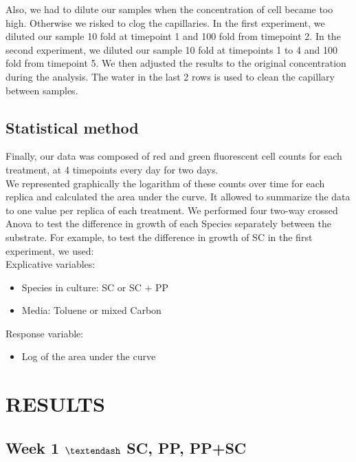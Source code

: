 \documentclass[a4paper, 10pt, conference]{ieeeconf}   %
\begin{document}
Also, we had to dilute our samples when the concentration of cell became too high. Otherwise we risked to clog the capillaries.
In the first experiment, we diluted our sample 10 fold at timepoint 1 and 100 fold from timepoint 2. In the second experiment, we diluted our sample 10 fold at timepoints 1 to 4 and 100 fold from timepoint 5.
We then adjusted the results to the original concentration during the analysis. The water in the last 2 rows is used to clean the capillary between samples.


\subsection{Statistical method}
Finally, our data was composed of red and green fluorescent cell counts for each treatment, at 4 timepoints every day for two days.\\
We represented graphically the logarithm of these counts over time for each replica and calculated the area under the curve. It allowed to summarize the data to one value per replica of each treatment.
We performed four two-way crossed Anova to test the difference in growth of each Species separately between the substrate. For example, to test the difference in growth of SC in the first experiment, we used: \\
Explicative variables:
\begin{itemize}
	\item Species in culture: SC or SC + PP
	\item Media: Toluene or mixed Carbon
\end{itemize}
Response variable:
\begin{itemize}
	\item Log of the area under the curve
\end{itemize}

\section{RESULTS}
\subsection{Week 1 $\textendash$ SC, PP, PP+SC}
\end{document}
